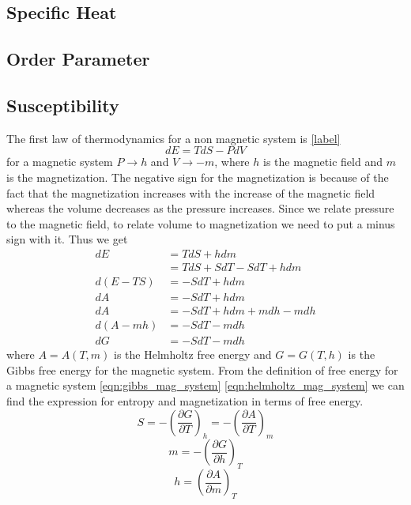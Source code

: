 	\subsection{Specific Heat}
	\subsection{Order Parameter}
	\subsection{Susceptibility}
	The first law of thermodynamics for a non magnetic system is \ref{label}
	\begin{equation}
		dE = TdS - PdV
	\end{equation}
	for a magnetic system $P \rightarrow h$ and $V \rightarrow -m$, where $h$ is the magnetic field and $m$ is the magnetization. The negative sign for the magnetization is because of the fact that the magnetization increases with the increase of the magnetic field whereas the volume decreases as the pressure increases. Since we relate pressure to the magnetic field, to relate volume to magnetization we need to put a minus sign with it. Thus we get
	\begin{align}
		dE &= TdS + hdm \\
		   &= TdS + SdT - SdT + h dm \\
		d(E - TS)  &= -SdT + h dm \\
		dA &= -SdT + h dm \label{eqn:helmholtz_mag_system} \\
		dA &= -SdT + h dm + m dh -m dh \\
		d(A - mh) &= -SdT - m dh\\
		dG &= -SdT -m dh \label{eqn:gibbs_mag_system}
	\end{align} 
	where $A=A(T,m)$ is the  Helmholtz free energy and $G=G(T,h)$ is the Gibbs free energy for the magnetic system. From the definition of free energy for a magnetic system \ref{eqn:gibbs_mag_system} \ref{eqn:helmholtz_mag_system} we can find the expression for entropy and magnetization in terms of free energy.
	\begin{equation}
		S = -\left(\frac{\partial G}{\partial T}\right)_h = -\left(\frac{\partial A}{\partial T}\right)_m
	\end{equation}
	\begin{equation}
		m = -\left(\frac{\partial G}{\partial h}\right)_T
		\label{eqn:magnetization_def}
	\end{equation}
	\begin{equation}
		h = \left(\frac{\partial A}{\partial m}\right)_T
		\label{eqn:mag_field_def}
	\end{equation}	
